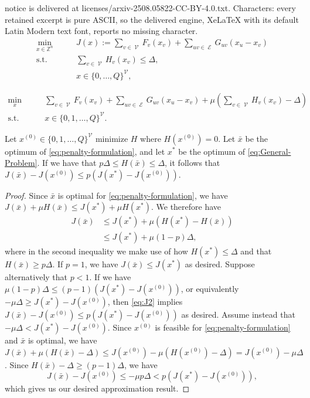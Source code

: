 \documentclass[10pt,a4paper]{amsart}
\DeclareMathOperator{\Ecal}{\mathcal{E}}
\DeclareMathOperator{\Vcal}{\mathcal{V}}
\newcommand{\Z}{\mathbb{Z}} %
\begin{document}
notice is delivered at licenses/arxiv-2508.05822-CC-BY-4.0.txt. Characters: every retained excerpt is pure ASCII, so the delivered engine, XeLaTeX with its default Latin Modern text font, reports no missing character.
\begin{align}
    \min_{x\in \Z^n} \qquad& J(x) := \sum_{v \in \Vcal}F_v(x_v) + \sum_{uv \in \Ecal}G_{uv}(x_u -x_v) \\
    \text{s.t.} \qquad& \sum_{v \in \Vcal} H_v(x_v) \le \Delta, \label{eq:budget-constraint}\\ 
    &x \in \{0,\dots,Q\}^{\Vcal},
\end{align} \label{eq:General-Problem}%

\begin{align}
    \min_{x} \qquad& \sum_{v\in \Vcal}F_v(x_v) + \sum_{uv\in \Ecal}G_{uv}(x_u - x_v) + \mu \left(\sum_{v \in \Vcal} H_v(x_v) - \Delta\right) \\
    \text{s.t.} \qquad& x \in \{0,1,\ldots,Q\}^{\Vcal} .
\end{align}\label{eq:penalty-formulation}%

\begin{prop}\label{prop:penalty-form}
    Let $x^{(0)} \in \{0,1,\ldots,Q\}^{\Vcal}$ minimize $H$ where $H(x^{(0)}) = 0$. Let $\bar{x}$ be the optimum of \eqref{eq:penalty-formulation}, and let $x^*$ be the optimum of \eqref{eq:General-Problem}. If we have that $p\Delta \le H(\bar{x})\le \Delta$, it follows that $J(\bar{x}) - J(x^{(0)}) \le p(J(x^*) - J(x^{(0)}))$.
\end{prop}

\begin{proof}
    Since $\bar{x}$ is optimal for \eqref{eq:penalty-formulation}, we have $J(\bar{x}) + \mu H(\bar{x}) \le J(x^*) + \mu H(x^*)$. We therefore have
    \begin{align}
    J(\bar{x}) &\le J(x^*) + \mu (H(x^*) - H(\bar{x})) \\
        &\le J(x^*) + \mu(1 - p)\Delta , \label{eq:J2}
    \end{align}
where in the second inequality we make use of how $H(x^*)\le \Delta$ and that $H(\bar{x}) \ge p\Delta$. 
If $p = 1$, we have $J(\bar{x}) \le J(x^*)$ as desired. Suppose alternatively that $p < 1$. 
If we have $\mu(1-p)\Delta \le (p-1)(J(x^*) - J(x^{(0)}))$, or equivalently $-\mu\Delta \ge J(x^*) - J(x^{(0)})$, then \eqref{eq:J2} implies $J(\bar{x}) - J(x^{(0)}) \le p(J(x^*) - J(x^{(0)}))$ as desired. 
Assume instead that $-\mu\Delta < J(x^*) - J(x^{(0)})$. 
Since $x^{(0)}$ is feasible for \eqref{eq:penalty-formulation} and $\bar{x}$ is optimal, we have $J(\bar{x}) + \mu(H(\bar{x}) - \Delta)\le J(x^{(0)})-\mu(H(x^{(0)}) - \Delta) = J(x^{(0)}) - \mu \Delta$. Since $H(\bar{x}) - \Delta \ge (p-1)\Delta$, we have
    \[
        J(\bar{x})  - J(x^{(0)}) \le -\mu p\Delta < p(J(x^*)-J(x^{(0)})) ,
    \]
which gives us our desired approximation result.
\end{proof}
\end{document}
